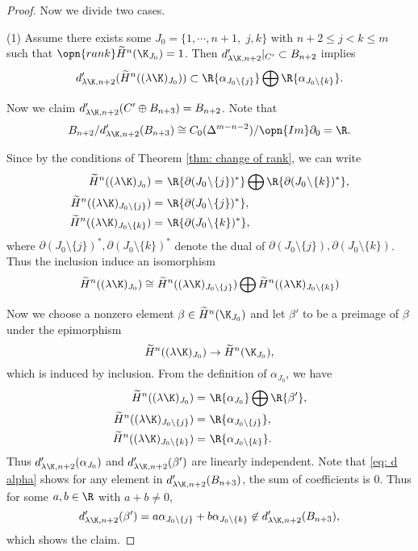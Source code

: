 \begin{proof}
Now we divide two cases.

(1) Assume there exists some $J_0=\{1,\cdots,n+1,$ $j,k\}$ with $n+2\le j<k\le m$ such that $\opn{rank} \widetilde{H}^n(\K_{J_0})=1$.
Then $d'_{\lambda\K,n+2}|_{C'}\subset B_{n+2}$ implies
$$d'_{\lambda\K,n+2}
(\widetilde{H}^n((\lambda\K)_{J_0}))
\subset \R\{\alpha_{J_0\setminus\{j\}}\}\bigoplus \R\{\alpha_{J_0\setminus\{k\}}\}.$$


Now we claim $d'_{\lambda\K,n+2}(C'\oplus B_{n+3})=B_{n+2}$. 
Note that
$$B_{n+2}/d'_{\lambda\K,n+2}(B_{n+3})
\cong C_0(\Delta^{m-n-2})/\opn{Im} \partial_0=\R.$$


Since by the conditions of Theorem \ref{thm: change of rank}, we can write
\begin{equation*}
    \begin{split}
        \widetilde{H}^n((\lambda\K)_{J_0})= & \
        \R \{ \partial(J_0\!\setminus\!\{j\})^*\} \bigoplus
        \R \{ \partial(J_0\!\setminus\!\{k\})^*\},\\
        \widetilde{H}^n((\lambda\K)_{J_0\setminus \{j\}})= & \
        \R \{ \partial(J_0\!\setminus\!\{j\})^*\},\\
        \widetilde{H}^n((\lambda\K)_{J_0\setminus \{k\}})= & \
        \R \{ \partial(J_0\!\setminus\!\{k\})^*\},\\
    \end{split}
\end{equation*}
where $\partial(J_0\!\setminus\!\{j\})^*,\partial(J_0\!\setminus\!\{k\})^*$ denote
the dual of $\partial(J_0\!\setminus\!\{j\}),\partial(J_0\!\setminus\!\{k\})$.
Thus the inclusion induce an isomorphism
$$\widetilde{H}^n((\lambda\K)_{J_0})
\cong \widetilde{H}^n((\lambda\K)_{J_0\setminus\{j\}})
\bigoplus \widetilde{H}^n((\lambda\K)_{J_0\setminus\{k\}})$$

Now we choose a nonzero element $\beta\in \widetilde{H}^n(\K_{J_0})$
and let $\beta'$ to be a preimage of $\beta$ under the epimorphism
$$\widetilde{H}^n((\lambda\K)_{J_0})
\to \widetilde{H}^n(\K_{J_0}),$$
which is induced by inclusion. From the definition of $\alpha_{J_0}$,
we have
\begin{equation*}
    \begin{split}
        \widetilde{H}^n((\lambda\K)_{J_0})= &\
        \R\{\alpha_{J_0}\}\bigoplus \R\{\beta'\},\\
        \widetilde{H}^n((\lambda\K)_{J_0\setminus\{j\}})= &\
        \R\{\alpha_{J_0\setminus\{j\}}\},\\
        \widetilde{H}^n((\lambda\K)_{J_0\setminus\{k\}})= &\
        \R\{\alpha_{J_0\setminus\{k\}}\}.\\
    \end{split}
\end{equation*}
Thus $d'_{\lambda\K,n+2}(\alpha_{J_0})$ and $d'_{\lambda\K,n+2}(\beta')$ are linearly independent.
Note that \eqref{eq: d alpha} shows for any element in
$d'_{\lambda\K,n+2}(B_{n+3})$,
the sum of coefficients is $0$.
Thus for some $a,b\in \R$ with $a+b\not=0$,
$$d'_{\lambda\K,n+2}(\beta')=a\alpha_{J_0\setminus\{j\}}+
b\alpha_{J_0\setminus\{k\}}\not\in d'_{\lambda\K,n+2}(B_{n+3}),$$
which shows the claim.


\end{proof}
